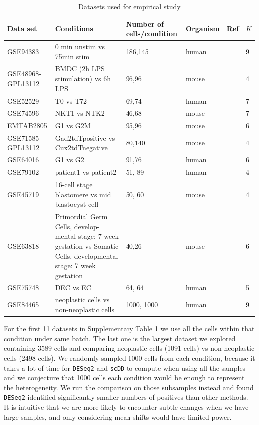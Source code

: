 \documentclass[aoas,preprint]{imsart}
\begin{document}
\begin{table}[h!]
\small
\centering
\begin{tabular}{ |p{2cm}|p{5cm}|p{2cm}|p{2cm}|p{2cm}|p{1cm}|}
\hline
 Data set & Conditions & Number of cells/condition & Organism  & Ref & $K$\\ \hline \hline
GSE94383 & 0 min unstim vs 75min stim & 186,145 & human & \citep{Lane} & 9\\ \hline
GSE48968-GPL13112 & BMDC (2h LPS stimulation) vs 6h LPS & 96,96 & mouse & \citep{Shalek} & 4\\ \hline
GSE52529 & T0 vs T72 & 69,74 & human & \citep{Trapnell} & 7\\ \hline
GSE74596 & NKT1 vs NTK2 & 46,68 & mouse & \citep{Engel} & 7\\ \hline
EMTAB2805 & G1 vs G2M & 95,96 & mouse & \citep{EMTAB} & 6\\ \hline
GSE71585-GPL13112 &Gad2tdTpositive vs Cux2tdTnegative  & 80,140 & mouse & \citep{Tasic} & 4\\ \hline
GSE64016 & G1 vs G2 & 91,76 & human & \citep{oscope} & 6\\ \hline
GSE79102 & patient1 vs patient2 & 51, 89 & human & \cite{sc3} & 4\\ \hline
GSE45719 & 16-cell stage blastomere vs mid blastocyst cell & 50, 60 & mouse & \citep{Deng193} & 4\\ \hline
GSE63818 & Primordial Germ Cells, develop- mental stage: 7 week gestation vs Somatic Cells, developmental stage: 7 week gestation & 40,26 & mouse & \citep{Guo} & 6\\ \hline
GSE75748 & DEC vs EC & 64, 64 & human & \citep{chu} & 5\\ \hline
GSE84465 & neoplastic cells vs non-neoplastic cells & 1000, 1000 & human & \citep{Darmanis} & 9\\ \hline
\end{tabular}
\caption{Datasets used for empirical study}
\label{table:1}
\end{table}

For the first 11 datasets in Supplementary Table \ref{table:1} we use all the cells within that condition under same batch.
The last one is the largest dataset we explored containing 3589 cells and comparing neoplastic cells (1091 cells) vs non-neoplastic cells (2498 cells).
We randomly sampled 1000 cells from each condition, because it takes a lot of time for \texttt{DESeq2} and \texttt{scDD} to compute when using all the samples
and we conjecture that 1000 cells each condition would be enough to represent the heterogeneity. %
We run the comparison on those subsamples instead 
and found \texttt{DESeq2} identified significantly smaller numbers of positives than other methods. It is intuitive that we are more likely to encounter subtle changes
when we have large samples, and only considering mean shifts would have limited power. 
\end{document}
